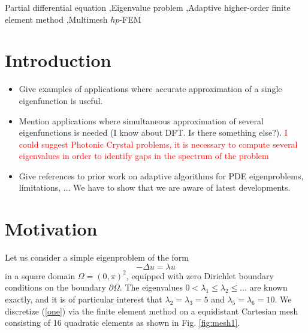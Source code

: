 \documentclass[preprint ,12pt]{elsarticle}
\begin{document}
\begin{frontmatter}
\begin{keyword}
Partial differential equation \sep Eigenvalue problem \sep Adaptive higher-order finite element
method \sep Multimesh $hp$-FEM
\end{keyword}

\end{frontmatter}


\section{Introduction}

\begin{itemize}
\item Give examples of applications where accurate approximation of  
      a single eigenfunction is useful.
\item Mention applications where simultaneous approximation of
      several eigenfunctions is needed (I know about DFT. Is there something else?). 
      \textcolor{red}{I could suggest Photonic Crystal problems, it is necessary to compute several eigenvalues in order to identify gaps in the spectrum of the problem}
\item Give references to prior work on adaptive algorithms for 
      PDE eigenproblems, limitations, ... We have to show that we are aware of 
      latest developments.
\end{itemize}


\section{Motivation}

Let us consider a simple eigenproblem of the form 
\begin{equation} \label{one}
-\Delta u = \lambda u
\end{equation}
in a square domain $\Omega = (0, \pi)^2$, equipped with zero Dirichlet boundary conditions 
on the boundary $\partial \Omega$. The eigenvalues $0 < \lambda_1 \le \lambda_2 \le \ldots$ 
are known exactly, and it is of particular interest that $\lambda_2 = \lambda_3 = 5$ and 
$\lambda_5 = \lambda_6 = 10$. We discretize (\ref{one}) via the finite element method
on a equidistant Cartesian mesh consisting of 16 quadratic elements as shown in Fig. \ref{fig:mesh1}.
\end{document}
